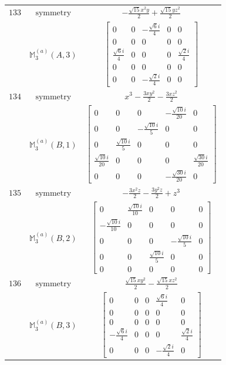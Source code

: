 \documentclass[fleqn,8pt,landscape]{jsarticle}
\begin{document}
\begin{longtable}{ccc}
$ 133 $ & $ \text{symmetry} $ & $ - \frac{\sqrt{15} x^{2} y}{2} + \frac{\sqrt{15} y z^{2}}{2} $ \\
$  $ & $ \mathbb{M}_{3}^{(a)}(A,3) $ & $ \begin{bmatrix} 0 & 0 & - \frac{\sqrt{6} i}{4} & 0 & 0 \\ 0 & 0 & 0 & 0 & 0 \\ \frac{\sqrt{6} i}{4} & 0 & 0 & 0 & \frac{\sqrt{2} i}{4} \\ 0 & 0 & 0 & 0 & 0 \\ 0 & 0 & - \frac{\sqrt{2} i}{4} & 0 & 0 \end{bmatrix} $ \\ \hline
$ 134 $ & $ \text{symmetry} $ & $ x^{3} - \frac{3 x y^{2}}{2} - \frac{3 x z^{2}}{2} $ \\
$  $ & $ \mathbb{M}_{3}^{(a)}(B,1) $ & $ \begin{bmatrix} 0 & 0 & 0 & - \frac{\sqrt{10} i}{20} & 0 \\ 0 & 0 & - \frac{\sqrt{10} i}{5} & 0 & 0 \\ 0 & \frac{\sqrt{10} i}{5} & 0 & 0 & 0 \\ \frac{\sqrt{10} i}{20} & 0 & 0 & 0 & \frac{\sqrt{30} i}{20} \\ 0 & 0 & 0 & - \frac{\sqrt{30} i}{20} & 0 \end{bmatrix} $ \\ \hline
$ 135 $ & $ \text{symmetry} $ & $ - \frac{3 x^{2} z}{2} - \frac{3 y^{2} z}{2} + z^{3} $ \\
$  $ & $ \mathbb{M}_{3}^{(a)}(B,2) $ & $ \begin{bmatrix} 0 & \frac{\sqrt{10} i}{10} & 0 & 0 & 0 \\ - \frac{\sqrt{10} i}{10} & 0 & 0 & 0 & 0 \\ 0 & 0 & 0 & - \frac{\sqrt{10} i}{5} & 0 \\ 0 & 0 & \frac{\sqrt{10} i}{5} & 0 & 0 \\ 0 & 0 & 0 & 0 & 0 \end{bmatrix} $ \\ \hline
$ 136 $ & $ \text{symmetry} $ & $ \frac{\sqrt{15} x y^{2}}{2} - \frac{\sqrt{15} x z^{2}}{2} $ \\
$  $ & $ \mathbb{M}_{3}^{(a)}(B,3) $ & $ \begin{bmatrix} 0 & 0 & 0 & \frac{\sqrt{6} i}{4} & 0 \\ 0 & 0 & 0 & 0 & 0 \\ 0 & 0 & 0 & 0 & 0 \\ - \frac{\sqrt{6} i}{4} & 0 & 0 & 0 & \frac{\sqrt{2} i}{4} \\ 0 & 0 & 0 & - \frac{\sqrt{2} i}{4} & 0 \end{bmatrix} $ \\ \hline

\end{longtable}
\end{document}
